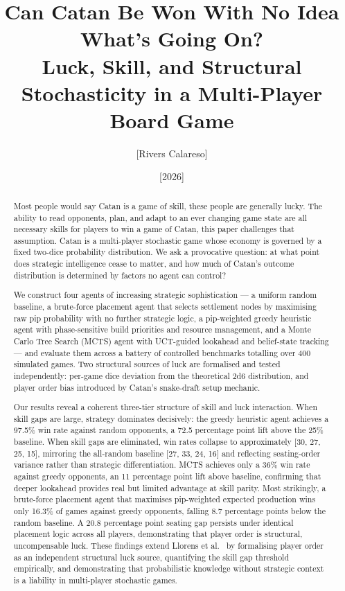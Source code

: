 \documentclass[12pt,a4paper]{article}
\title{
  \Large\textbf{Can Catan Be Won With No Idea What's Going On?}\\[0.4em]
  \large Luck, Skill, and Structural Stochasticity in a Multi-Player Board Game
}
\author{
[Rivers Calareso]}\\
\date{[2026]}
\begin{document}

\maketitle
\thispagestyle{empty}

\begin{abstract}
Most people would say Catan is a game of skill, these people are 
generally lucky. The ability to read opponents, plan, and adapt to an 
ever changing game state are all necessary skills for players to win a 
game of Catan, this paper challenges that assumption. Catan 
is a multi-player stochastic game whose economy is governed by a 
fixed two-dice probability distribution. We ask a provocative question: 
at what point does strategic intelligence cease to matter, and how much of 
Catan's outcome distribution is determined by factors no agent can control?


We construct four agents of increasing strategic sophistication --- a
uniform random baseline, a brute-force placement agent that selects
settlement nodes by maximising raw pip probability with no further
strategic logic, a pip-weighted greedy heuristic agent with
phase-sensitive build priorities and resource management, and a Monte
Carlo Tree Search (MCTS) agent with UCT-guided lookahead and belief-state
tracking --- and evaluate them across a battery of controlled benchmarks
totalling over 400 simulated games. Two structural sources of luck are
formalised and tested independently: per-game dice deviation from the
theoretical 2d6 distribution, and player order bias introduced by
Catan's snake-draft setup mechanic.

Our results reveal a coherent three-tier structure of skill and luck
interaction. When skill gaps are large, strategy dominates decisively:
the greedy heuristic agent achieves a 97.5\% win rate against random
opponents, a 72.5 percentage point lift above the 25\% baseline. When
skill gaps are eliminated, win rates collapse to approximately [30, 27,
25, 15], mirroring the all-random baseline [27, 33, 24, 16] and
reflecting seating-order variance rather than strategic differentiation.
MCTS achieves only a 36\% win rate against greedy opponents, an 11
percentage point lift above baseline, confirming that deeper lookahead
provides real but limited advantage at skill parity. Most strikingly, a
brute-force placement agent that maximises pip-weighted expected
production wins only 16.3\% of games against greedy opponents, falling
8.7 percentage points below the random baseline. A 20.8 percentage point
seating gap persists under identical placement logic across all players,
demonstrating that player order is structural, uncompensable luck. These
findings extend Llorens et al.~\cite{llorens2025seeding} by formalising
player order as an independent structural luck source, quantifying the
skill gap threshold empirically, and demonstrating that probabilistic
knowledge without strategic context is a liability in multi-player
stochastic games.


\end{abstract}
\end{document}
